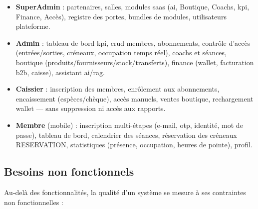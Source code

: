 \documentclass[../main.tex]{subfiles}
\begin{document}
\begin{itemize}
  \item \textbf{SuperAdmin} : partenaires, salles, modules \acrshort{saas} (\acrshort{ai}, Boutique, Coachs, \acrshort{kpi}, Finance, Acc\`{e}s), registre des portes, bundles de modules, utilisateurs plateforme.
  \item \textbf{Admin} : tableau de bord \acrshort{kpi}, \acrshort{crud} membres, abonnements, contr\^{o}le d'acc\`{e}s (entr\'{e}es/sorties, cr\'{e}neaux, occupation temps r\'{e}el), coachs et s\'{e}ances, boutique (produits/fournisseurs/stock/transferts), finance (wallet, facturation \acrshort{b2b}, caisse), assistant \acrshort{ai}/\acrshort{rag}.
  \item \textbf{Caissier} : inscription des membres, enr\^{o}lement aux abonnements, encaissement (esp\`{e}ces/ch\`{e}que), acc\`{e}s manuels, ventes boutique, rechargement wallet --- sans suppression ni acc\`{e}s aux rapports.
  \item \textbf{Membre} (mobile) : inscription multi-\'{e}tapes (e-mail, \acrshort{otp}, identit\'{e}, mot de passe), tableau de bord, calendrier des s\'{e}ances, r\'{e}servation des cr\'{e}neaux RESERVATION, statistiques (pr\'{e}sence, occupation, heures de pointe), profil.
\end{itemize}

\subsection{Besoins non fonctionnels}
Au-del\`{a} des fonctionnalit\'{e}s, la qualit\'{e} d'un syst\`{e}me se mesure \`{a} ses contraintes non fonctionnelles \cite{functional_req} :
\end{document}
